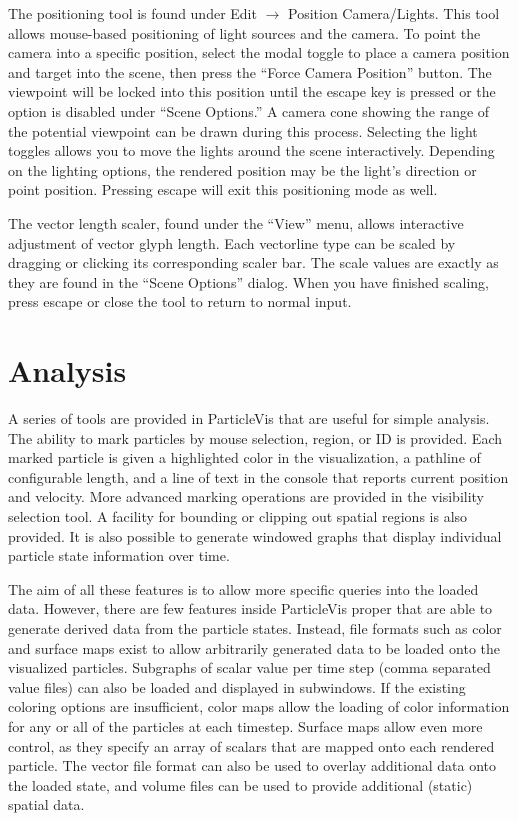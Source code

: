   The positioning tool is found under Edit $\rightarrow$ Position Camera/Lights.  This tool allows mouse-based positioning of light sources and the camera.  To point the camera into a specific position, select the modal toggle to place a camera position and target into the scene, then press the ``Force Camera Position'' button.  The viewpoint will be locked into this position until the escape key is pressed or the option is disabled under ``Scene Options.''  A camera cone showing the range of the potential viewpoint can be drawn during this process.  Selecting the light toggles allows you to move the lights around the scene interactively.  Depending on the lighting options, the rendered position may be the light's direction or point position.  Pressing escape will exit this positioning mode as well.
  
  The vector length scaler, found under the ``View'' menu, allows interactive adjustment of vector glyph length.  Each vectorline type can be scaled by dragging or clicking its corresponding scaler bar.  The scale values are exactly as they are found in the ``Scene Options'' dialog.  When you have finished scaling, press escape or close the tool to return to normal input.

\section{Analysis}
	A series of tools are provided in ParticleVis that are useful for simple analysis.  The ability to mark particles by mouse selection, region, or ID is provided.  Each marked particle is given a highlighted color in the visualization, a pathline of configurable length, and a line of text in the console that reports current position and velocity.  More advanced marking operations are provided in the visibility selection tool.  A facility for bounding or clipping out spatial regions is also provided.  It is also possible to generate windowed graphs that display individual particle state information over time.
	
	The aim of all these features is to allow more specific queries into the loaded data.  However, there are few features inside ParticleVis proper that are able to generate derived data from the particle states.  Instead, file formats such as color and surface maps exist to allow arbitrarily generated data to be loaded onto the visualized particles.  Subgraphs of scalar value per time step (comma separated value files) can also be loaded and displayed in subwindows.  If the existing coloring options are insufficient, color maps allow the loading of color information for any or all of the particles at each timestep.  Surface maps allow even more control, as they specify an array of scalars that are mapped onto each rendered particle.  The vector file format can also be used to overlay additional data onto the loaded state, and volume files can be used to provide additional (static) spatial data.
		

